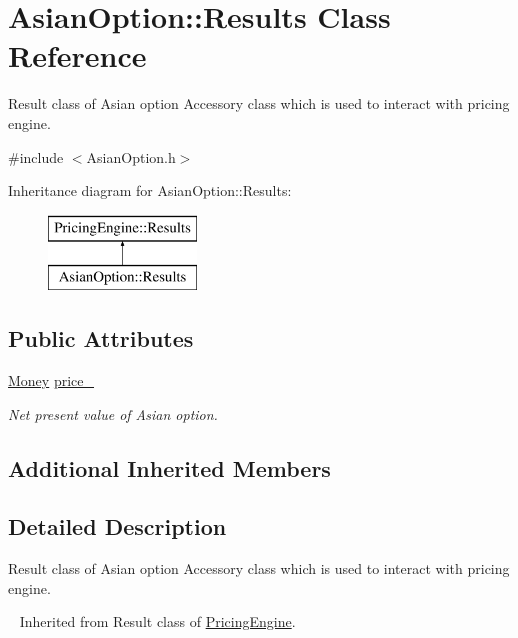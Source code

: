 \hypertarget{class_asian_option_1_1_results}{}\section{Asian\+Option\+:\+:Results Class Reference}
\label{class_asian_option_1_1_results}


Result class of Asian option Accessory class which is used to interact with pricing engine.  




{\ttfamily \#include $<$Asian\+Option.\+h$>$}

Inheritance diagram for Asian\+Option\+:\+:Results\+:\begin{figure}[H]
\begin{center}
\leavevmode
\includegraphics[height=2.000000cm]{class_asian_option_1_1_results}
\end{center}
\end{figure}
\subsection*{Public Attributes}
\begin{DoxyCompactItemize}
\item 
\hyperlink{_name_def_8h_a5a9d48c16a694e9a2d9f1eca730dc8c5}{Money} \hyperlink{class_asian_option_1_1_results_a9e4e4e2612f105b940b1562d7f126a89}{price\+\_\+}
\begin{DoxyCompactList}\small\item\em Net present value of Asian option. \end{DoxyCompactList}\end{DoxyCompactItemize}
\subsection*{Additional Inherited Members}


\subsection{Detailed Description}
Result class of Asian option Accessory class which is used to interact with pricing engine. 

~\newline
Inherited from Result class of \hyperlink{class_pricing_engine}{Pricing\+Engine}. 

